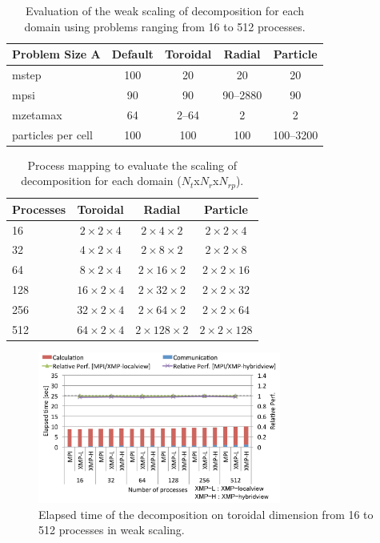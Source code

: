 \begin{table}[t]
\begin{center}
\caption{Evaluation of the weak scaling of decomposition for each domain using problems ranging from 16 to 512 processes.}
{\scriptsize
\label{problem}
\begin{tabular}{l|c|c|c|c} \hline\hline
Problem Size A & Default & Toroidal & Radial & Particle\\ \hline 
mstep & 100 & 20 & 20 & 20 \\
mpsi & 90 & 90 & 90--2880 & 90 \\
mzetamax & 64 & 2--64 & 2 & 2\\
particles per cell & 100 & 100 & 100 & 100--3200\\ \hline
\end{tabular}
}
\end{center}
\end{table}


\begin{table}[t]
\begin{center}
\caption{Process mapping to evaluate the scaling of decomposition for each domain ($N_t$x$N_r$x$N_{rp}$).}
{\scriptsize
\label{decomposition}
\begin{tabular}{l|c|c|c} \hline\hline
Processes & Toroidal & Radial & Particle \\ \hline
16 & $2 \times 2 \times 4$ & $2 \times 4 \times 2$ & $2 \times 2 \times 4$ \\
32 & $4 \times 2 \times 4$ & $2 \times 8 \times 2$ & $2 \times 2 \times 8$ \\
64 & $8 \times 2 \times 4$ & $2 \times 16 \times 2$ & $2 \times 2 \times 16$ \\
128 & $16 \times 2 \times 4$ & $2 \times 32 \times 2$ & $2 \times 2 \times 32$ \\
256 & $32 \times 2 \times 4$ & $2 \times 64 \times 2$ & $2 \times 2 \times 64$ \\ 
512 & $64 \times 2 \times 4$ & $2 \times 128 \times 2$ & $2 \times 2 \times 128$ \\ \hline

\end{tabular}
}
\end{center}
\end{table}



\begin{figure}[t]
\begin{center}
\includegraphics[width=8cm, bb=0 0 492 306]{./figure/toroidal_w.pdf}
\caption{Elapsed time of the decomposition on toroidal dimension from 16 to 512 processes in weak scaling.}
\label{toroidal_w}
\end{center}
\end{figure}



